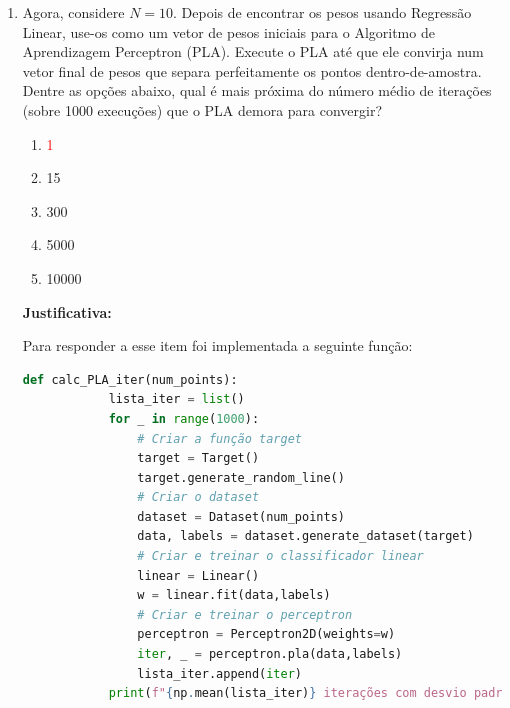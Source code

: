 \begin{enumerate}
    \item Agora, considere $N = 10$. Depois de encontrar os pesos usando Regressão Linear, use-os como um vetor de pesos iniciais para o Algoritmo de Aprendizagem Perceptron (PLA). Execute o PLA até que ele convirja num vetor final de pesos que separa perfeitamente os pontos dentro-de-amostra. Dentre as opções abaixo, qual é mais próxima do número médio de iterações (sobre 1000 execuções) que o PLA demora para convergir?
    
    \begin{enumerate}
        \item [\textcolor{red}{(a)}]\textcolor{red}{1}\addtocounter{enumii}{1}
        \item 15
        \item 300
        \item 5000
        \item 10000
    \end{enumerate}

    \par

    \textbf{Justificativa:}

    Para responder a esse item foi implementada a seguinte função:

    \begin{lstlisting}[language=Python, caption=Cálculo do número de iterações do PLA, label=cod:calc_PLA_iter]
        def calc_PLA_iter(num_points):
            lista_iter = list()
            for _ in range(1000):
                # Criar a função target
                target = Target()
                target.generate_random_line()
                # Criar o dataset
                dataset = Dataset(num_points)
                data, labels = dataset.generate_dataset(target)
                # Criar e treinar o classificador linear
                linear = Linear()
                w = linear.fit(data,labels)
                # Criar e treinar o perceptron
                perceptron = Perceptron2D(weights=w)
                iter, _ = perceptron.pla(data,labels)
                lista_iter.append(iter)
            print(f"{np.mean(lista_iter)} iterações com desvio padrão {np.std(lista_iter):.4f} (min:{np.min(lista_iter)}, máx:{np.max(lista_iter)})")
    \end{lstlisting}


\end{enumerate}
